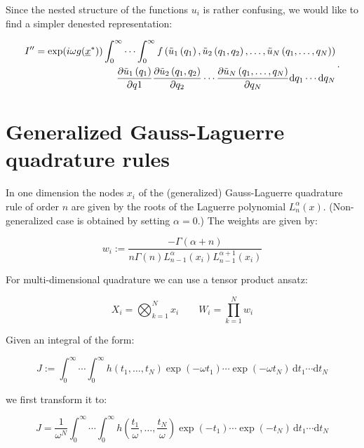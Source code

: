 \documentclass[a4paper,10pt]{article}
\begin{document}
Since the nested structure of the functions $u_i$ is rather confusing,
we would like to find a simpler denested representation:

\begin{equation} \label{eq:noi2}
 \begin{split}
 I^{\prime\prime} = \exp(i \omega g(\underline{x}^{*}))
     \int_{0}^{\infty} \cdots \int_{0}^{\infty}
     f\left(\tilde{u}_1\left(q_1\right), \tilde{u}_2\left(q_1, q_2\right), \ldots, \tilde{u}_N\left(q_1, \ldots, q_N\right)\right) \\
     \frac{\partial \tilde{u}_1\left(q_1\right)}{\partial q1}
     \frac{\partial \tilde{u}_2\left(q_1, q_2\right)}{\partial q_2}
     \cdots
     \frac{\partial \tilde{u}_N\left(q_1, \ldots, q_N\right)}{\partial q_N}
     \mathrm{d}q_1 \cdots \mathrm{d}q_N
 \end{split} \,.
\end{equation}


\section{Generalized Gauss-Laguerre quadrature rules}

In one dimension the nodes $x_i$ of the (generalized) Gauss-Laguerre quadrature
rule of order $n$ are given by the roots of the Laguerre polynomial $L^{\alpha}_n(x)$.
(Non-generalized case is obtained by setting $\alpha = 0$.) The weights are given by:

\begin{equation}
 w_i := \frac{-\Gamma(\alpha+n)}{n \Gamma(n) L^{\alpha}_{n-1}(x_i) L^{\alpha+1}_{n-1}(x_i)}
\end{equation}

For multi-dimensional quadrature we can use a tensor product ansatz:

\begin{equation}
 X_i = \bigotimes_{k=1}^N x_i \quad\quad
 W_i = \prod_{k=1}^N w_i
\end{equation}

Given an integral of the form:

\begin{equation}
 J := \int_{0}^{\infty} \cdots \int_{0}^{\infty} h(t_1, \ldots, t_N) \exp(-\omega t_1) \cdots \exp(-\omega t_N)
 \, \mathrm{d}t_1 \cdots \mathrm{d}t_N
\end{equation}

we first transform it to:

\begin{equation}
 J = \frac{1}{\omega^N}
 \int_{0}^{\infty} \cdots \int_{0}^{\infty} h\left(\frac{t_1}{\omega}, \ldots, \frac{t_N}{\omega}\right)
 \exp(-t_1) \cdots \exp(-t_N) \, \mathrm{d}t_1 \cdots \mathrm{d}t_N
\end{equation}
\end{document}

